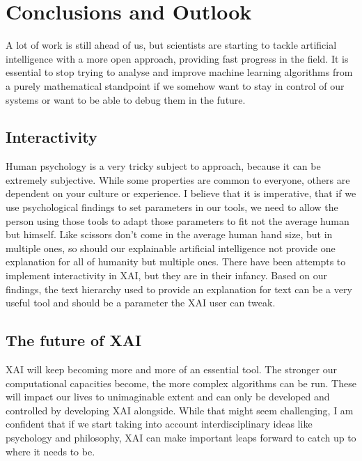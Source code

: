 \chapter{Conclusions and Outlook}
\label{ch:outlook}
A lot of work is still ahead of us, but scientists are starting to tackle artificial intelligence with a more open approach, providing fast progress in the field. It is essential to stop trying to analyse and improve machine learning algorithms from a purely mathematical standpoint if we somehow want to stay in control of our systems or want to be able to debug them in the future.

\section{Interactivity}

 Human psychology is a very tricky subject to approach, because it can be extremely subjective. While some properties are common to everyone, others are dependent on your culture or experience. I believe that it is imperative, that if we use psychological findings to set parameters in our tools, we need to allow the person using those tools to adapt those parameters to fit not the average human but himself. Like scissors don't come in the average human hand size, but in multiple ones, so should our explainable artificial intelligence not provide one explanation for all of humanity but multiple ones. There have been attempts to implement interactivity in XAI, but they are in their infancy. Based on our findings, the text hierarchy used to provide an explanation for text can be a very useful tool and should be a parameter the XAI user can tweak.

\section{The future of XAI}

XAI will keep becoming more and more of an essential tool. The stronger our computational capacities become, the more complex algorithms can be run. These will impact our lives to unimaginable extent and can only be developed and controlled by developing XAI alongside. While that might seem challenging, I am confident that if we start taking into account interdisciplinary ideas like psychology and philosophy, XAI can make important leaps forward to catch up to where it needs to be.
